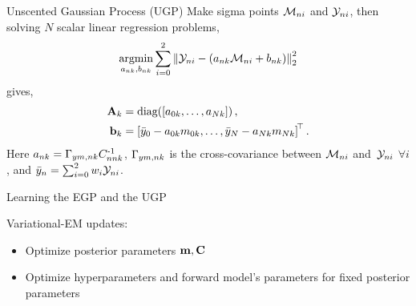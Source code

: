 \documentclass[final]{beamer}
\newlength{\onecolwid}
\begin{document}
\begin{frame}[t]
\begin{columns}[t]
\begin{column}{\onecolwid}
\begin{block}{Unscented Gaussian Process (UGP)}
Make sigma points \cite{Julier2004} $\Sfunc_{ni}$ and $\Sobs_{ni}$,
then solving $N$ scalar linear regression problems,
\begin{equation*}
    \argmin_{\Lins_{nk}, \intcpts_{nk}} \sum^{2}_{i=0} 
        \lnorm{2}{\Sobs_{ni} - \brac{\Lins_{nk}\Sfunc_{ni} + \intcpts_{nk}}}^2
\end{equation*}
gives,
\begin{align}
    \Linmat_k &= \diag{\sbrac{\Lins_{0k}, \ldots, \Lins_{Nk}}}, \\
    \intcpt_k &= \sbrac{\bar\obss_{0} - \Lins_{0k}\pomeans_{0k}, \ldots,
        \bar\obss_{N} - \Lins_{Nk}\pomeans_{Nk}}\transpose. \nonumber
\end{align}
Here $\Lins_{nk} = \xcovs_{\obss\pomeans,nk} \pocovs_{nnk}\inv$, 
$\xcovs_{\obss\pomeans,nk}$ is the cross-covariance between $\Sfunc_{ni}$ 
and~$\Sobs_{ni}$ $\forall i$, and $\bar\obss_n = \sum_{i=0}^2 \Sw_i
\Sobs_{ni}$.

\end{block}






\begin{block}{Learning the EGP and the UGP}


Variational-EM updates:
\begin{itemize}
	\item
		Optimize posterior parameters $\pomean, \pocov$
	\item
		Optimize hyperparameters and forward model's parameters 
		for fixed posterior parameters
\end{itemize}
\end{block}






\end{column}
\end{columns}
\end{frame}
\end{document}
